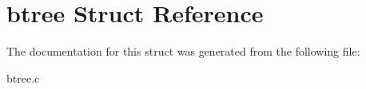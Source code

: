 \hypertarget{structbtree}{}\section{btree Struct Reference}
\label{structbtree}


The documentation for this struct was generated from the following file\+:\begin{DoxyCompactItemize}
\item 
btree.\+c\end{DoxyCompactItemize}
